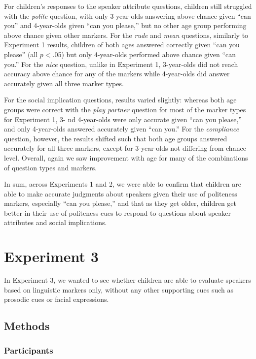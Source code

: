 \documentclass[10pt, letterpaper]{article}
\begin{document}
For children's responses to the speaker attribute questions, children
still struggled with the \emph{polite} question, with only 3-year-olds
answering above chance given ``can you'' and 4-year-olds given ``can you
please,'' but no other age group performing above chance given other
markers. For the \emph{rude} and \emph{mean} questions, similarly to
Experiment 1 results, children of both ages answered correctly given
``can you please'' (all \(p<\).05) but only 4-year-olds performed above
chance given ``can you.'' For the \emph{nice} question, unlike in
Experiment 1, 3-year-olds did not reach accuracy above chance for any of
the markers while 4-year-olds did answer accurately given all three
marker types.

For the social implication questions, results varied slightly: whereas
both age groups were correct with the \emph{play partner} question for
most of the marker types for Experiment 1, 3- nd 4-year-olds were only
accurate given ``can you please,'' and only 4-year-olds answered
accurately given ``can you.'' For the \emph{compliance} question,
however, the results shifted such that both age groups answered
accurately for all three markers, except for 3-year-olds not differing
from chance level. Overall, again we saw improvement with age for many
of the combinations of question types and markers.

In sum, across Experiments 1 and 2, we were able to confirm that
children are able to make accurate judgments about speakers given their
use of politeness markers, especially ``can you please,'' and that as
they get older, children get better in their use of politeness cues to
respond to questions about speaker attributes and social implications.

\section{Experiment 3}\label{experiment-3}

In Experiment 3, we wanted to see whether children are able to evaluate
speakers based on linguistic markers only, without any other supporting
cues such as prosodic cues or facial expressions.

\subsection{Methods}\label{methods-1}

\subsubsection{Participants}\label{participants-2}
\end{document}
